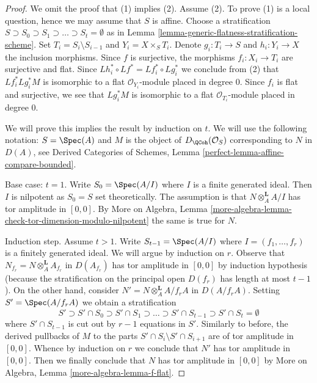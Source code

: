\begin{proof}
We omit the proof that (1) implies (2). Assume (2). To prove (1)
is a local question, hence we may assume that $S$ is affine.
Choose a stratification
$S \supset S_0 \supset S_1 \supset \ldots \supset S_t = \emptyset$
as in Lemma \ref{lemma-generic-flatness-stratification-scheme}.
Set $T_i = S_i \setminus S_{i - 1}$ and $Y_i = X \times_S T_i$.
Denote $g_i : T_i \to S$ and $h_i : Y_i \to X$ the inclusion morphisms.
Since $f$ is surjective, the morphisms $f_i : X_i \to T_i$
are surjective and flat. Since
$Lh_i^* \circ Lf^* = Lf_i^* \circ Lg_i^*$ we conclude from (2) that
$Lf_i^* Lg_i^*M$ is isomorphic to a flat $\mathcal{O}_{Y_i}$-module
placed in degree $0$. Since $f_i$ is flat and surjective, we see that
$Lg_i^*M$ is isomorphic to a flat $\mathcal{O}_{T_i}$-module
placed in degree $0$.

\medskip\noindent
We will prove this implies the result by induction on $t$.
We will use the following notation: $S = \Spec(A)$ and $M$
is the object of $D_\QCoh(\mathcal{O}_S)$ corresponding to
$N$ in $D(A)$, see Derived Categories of Schemes, Lemma
\ref{perfect-lemma-affine-compare-bounded}.

\medskip\noindent
Base case: $t = 1$. Write $S_0 = \Spec(A/I)$ where
$I$ is a finite generated ideal. Then $I$ is nilpotent as $S_0 = S$
set theoretically. The assumption is that $N \otimes_A^\mathbf{L} A/I$
has tor amplitude in $[0, 0]$. By More on Algebra, Lemma
\ref{more-algebra-lemma-check-tor-dimension-modulo-nilpotent}
the same is true for $N$.

\medskip\noindent
Induction step. Assume $t > 1$. Write $S_{t - 1} = \Spec(A/I)$
where $I = (f_1, \ldots, f_r)$ is a finitely generated ideal.
We will argue by induction on $r$. Observe that
$N_{f_r} = N \otimes_A^\mathbf{L} A_{f_r}$ in $D(A_{f_r})$
has tor amplitude in $[0, 0]$ by induction hypothesis
(because the stratification on the principal open $D(f_r)$ has length
at most $t - 1$). On the other hand, consider
$N' = N \otimes_A^\mathbf{L} A/f_rA$ in $D(A/f_rA)$.
Setting $S' = \Spec(A/f_rA)$ we obtain a stratification
$$
S' \supset S' \cap S_0 \supset S' \cap S_1 \supset \ldots \supset
S' \cap S_{t - 1} \supset
S' \cap S_t = \emptyset
$$
where $S' \cap S_{t - 1}$ is cut out by $r - 1$ equations in $S'$.
Similarly to before, the derived pullbacks of $M$ to the parts
$S' \cap S_i \setminus S' \cap S_{i + 1}$ are of tor amplitude
in $[0, 0]$. Whence by induction on $r$ we conclude that
$N'$ has tor amplitude in $[0, 0]$.
Then we finally conclude that $N$ has tor amplitude in $[0, 0]$
by More on Algebra, Lemma \ref{more-algebra-lemma-f-flat}.
\end{proof}

